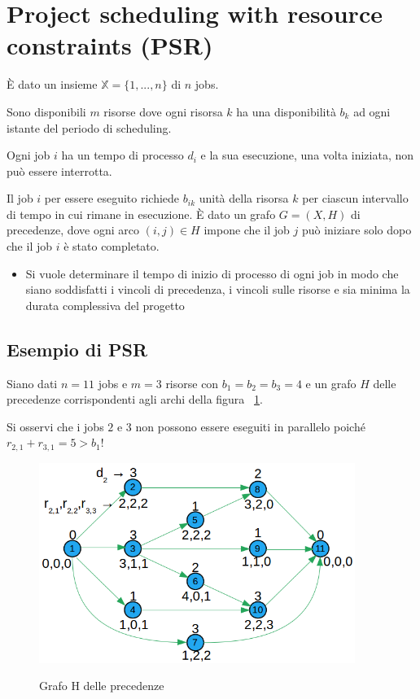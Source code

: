 \section{Project scheduling with resource constraints (PSR)}
\`E dato un insieme $\mathbb{X}=\{1,...,n\}$ di $n$ jobs.

Sono disponibili $m$ risorse dove ogni risorsa $k$ ha una disponibilità $b_{k}$ ad ogni istante del periodo di scheduling.

Ogni job $i$ ha un tempo di processo $d_{i}$ e la sua esecuzione, una volta iniziata, non può essere interrotta.

Il job $i$ per essere eseguito richiede $b_{ik}$ unità della risorsa $k$ per ciascun intervallo di tempo in cui rimane in esecuzione.\newline
\`E dato un grafo $G=(X,H)$ di precedenze, dove ogni arco $(i,j)\in H$ impone che il job $j$ può iniziare solo dopo che il job $i$ è stato completato.

\begin{itemize}
	\item Si vuole determinare il tempo di inizio di processo di ogni job in modo che siano soddisfatti i vincoli di precedenza, i vincoli sulle risorse e sia minima la durata complessiva del progetto
\end{itemize}

\subsection{Esempio di PSR}
Siano dati $n=11$ jobs e $m=3$ risorse con $b_{1}=b_{2}=b_{3}=4$ e un grafo $H$ delle precedenze corrispondenti agli archi della figura ~\ref{fig:grafoHDellePrecedenze}.

Si osservi che i jobs $2$ e $3$ non possono essere eseguiti in parallelo poiché $r_{2,1}+r_{3,1}=5 > b_{1}$!

\begin{figure}[h]
	\caption{Grafo H delle precedenze}
	\centering
	\includegraphics[height=6.5cm]{images/graph2.png}
	\label{fig:grafoHDellePrecedenze}
\end{figure}

